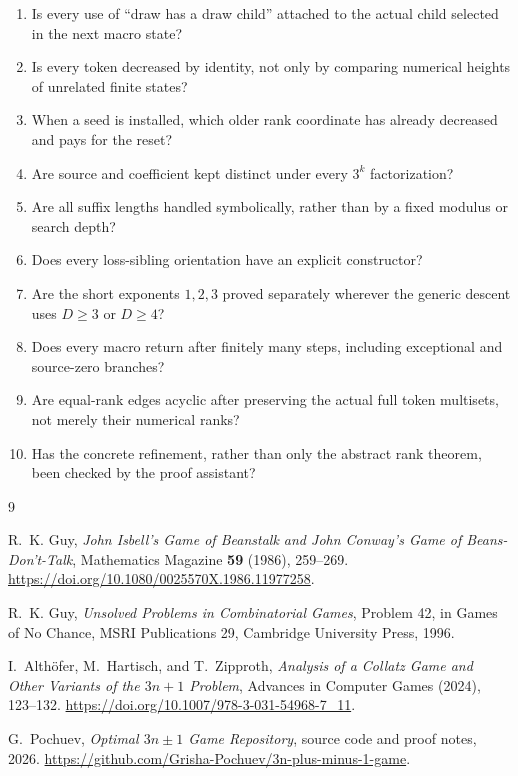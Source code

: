\documentclass[11pt]{article}
\theoremstyle{definition}
\begin{document}
\begin{enumerate}
\item[\textbf{A1.}] Is every use of ``draw has a draw child'' attached to the actual child
      selected in the next macro state?
\item[\textbf{A2.}] Is every token decreased by identity, not only by comparing numerical
      heights of unrelated finite states?
\item[\textbf{A3.}] When a seed is installed, which older rank coordinate has already
      decreased and pays for the reset?
\item[\textbf{A4.}] Are source and coefficient kept distinct under every $3^k$ factorization?
\item[\textbf{A5.}] Are all suffix lengths handled symbolically, rather than by a fixed
      modulus or search depth?
\item[\textbf{A6.}] Does every loss-sibling orientation have an explicit constructor?
\item[\textbf{A7.}] Are the short exponents $1,2,3$ proved separately wherever the generic
      descent uses $D\ge3$ or $D\ge4$?
\item[\textbf{A8.}] Does every macro return after finitely many steps, including exceptional
      and source-zero branches?
\item[\textbf{A9.}] Are equal-rank edges acyclic after preserving the actual full token
      multisets, not merely their numerical ranks?
\item[\textbf{A10.}] Has the concrete refinement, rather than only the abstract rank theorem,
      been checked by the proof assistant?
\end{enumerate}

\begin{thebibliography}{9}

R.~K. Guy,
\emph{John Isbell's Game of Beanstalk and John Conway's Game of
Beans-Don't-Talk},
Mathematics Magazine \textbf{59} (1986), 259--269.
\url{https://doi.org/10.1080/0025570X.1986.11977258}.

R.~K. Guy,
\emph{Unsolved Problems in Combinatorial Games}, Problem 42,
in Games of No Chance, MSRI Publications 29, Cambridge University Press,
1996.

I.~Alth\"ofer, M.~Hartisch, and T.~Zipproth,
\emph{Analysis of a Collatz Game and Other Variants of the $3n+1$ Problem},
Advances in Computer Games (2024), 123--132.
\url{https://doi.org/10.1007/978-3-031-54968-7_11}.

G.~Pochuev,
\emph{Optimal $3n\mathbin{\pm}1$ Game Repository}, source code and proof
notes, 2026.  \url{https://github.com/Grisha-Pochuev/3n-plus-minus-1-game}.

\end{thebibliography}
\end{document}
